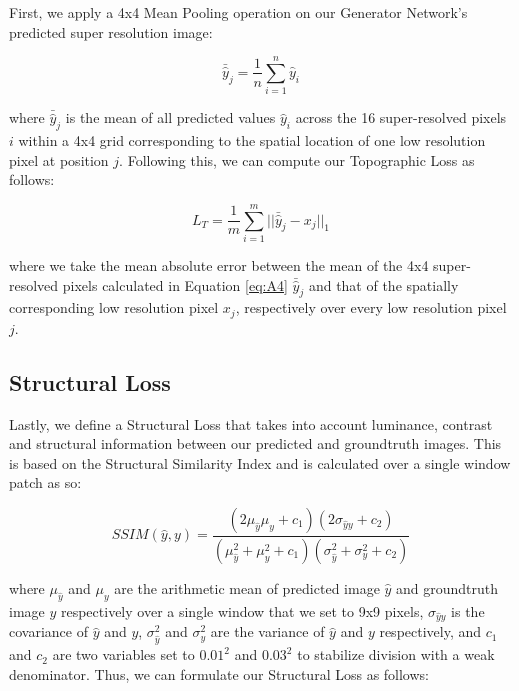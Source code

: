\documentclass[tc, manuscript]{copernicus}
\begin{document}
First, we apply a 4x4 Mean Pooling operation on our Generator Network's predicted super resolution image:

\begin{equation}\label{eq:A4}
 \bar{\hat{y}}_j = \dfrac{1}{n} \sum\limits_{i=1}^n \hat{y}_i
\end{equation}

where $\bar{\hat{y}}_j$ is the mean of all predicted values $\hat{y}_i$ across the 16 super-resolved pixels $i$ within a 4x4 grid corresponding to the spatial location of one low resolution pixel at position $j$.
Following this, we can compute our Topographic Loss as follows:

\begin{equation}\label{eq:A5}
  L_T = \dfrac{1}{m} \sum\limits_{i=1}^m ||\bar{\hat{y}}_j - x_j||_{1}
\end{equation}

where we take the mean absolute error between the mean of the 4x4 super-resolved pixels calculated in Equation \eqref{eq:A4} $\bar{\hat{y}}_j$ and that of the spatially corresponding low resolution pixel $x_j$, respectively over every low resolution pixel $j$.

\subsection{Structural Loss}

Lastly, we define a Structural Loss that takes into account luminance, contrast and structural information between our predicted and groundtruth images.
This is based on the Structural Similarity Index \citep[SSIM,][]{WangImageQualityAssessment2004} and is calculated over a single window patch as so:

\begin{equation}\label{eq:A6}
  SSIM(\hat{y}, y) = \dfrac{(2\mu_{\hat{y}}\mu_y + c_1)(2\sigma_{{\hat{y}}y} + c_2)}{(\mu_{\hat{y}}^2 + \mu_y^2 + c_1)(\sigma_{\hat{y}}^2 + \sigma_y^2 + c_2)}
\end{equation}

where $\mu_{\hat{y}}$ and $\mu_y$ are the arithmetic mean of predicted image ${\hat{y}}$ and groundtruth image $y$ respectively over a single window that we set to 9x9 pixels, $\sigma_{{\hat{y}}y}$ is the covariance of ${\hat{y}}$ and $y$, $\sigma_{\hat{y}}^2$ and $\sigma_y^2$ are the variance of ${\hat{y}}$ and $y$ respectively, and $c_1$ and $c_2$ are two variables set to $0.01^2$ and $0.03^2$ to stabilize division with a weak denominator.
Thus, we can formulate our Structural Loss as follows:
\end{document}
